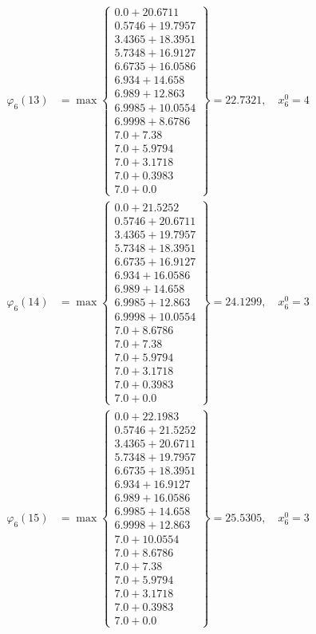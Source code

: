 \documentclass{article}
\begin{document}
\begin{align*}
\varphi_{6}(13) &= \max \left\{ \begin{array}{c}
0.0 + 20.6711 \\
 0.5746 + 19.7957 \\
 3.4365 + 18.3951 \\
 5.7348 + 16.9127 \\
 6.6735 + 16.0586 \\
 6.934 + 14.658 \\
 6.989 + 12.863 \\
 6.9985 + 10.0554 \\
 6.9998 + 8.6786 \\
 7.0 + 7.38 \\
 7.0 + 5.9794 \\
 7.0 + 3.1718 \\
 7.0 + 0.3983 \\
 7.0 + 0.0
\end{array} \right\}=22.7321, \quad x_{6}^0=4\\
  
\varphi_{6}(14) &= \max \left\{ \begin{array}{c}
0.0 + 21.5252 \\
 0.5746 + 20.6711 \\
 3.4365 + 19.7957 \\
 5.7348 + 18.3951 \\
 6.6735 + 16.9127 \\
 6.934 + 16.0586 \\
 6.989 + 14.658 \\
 6.9985 + 12.863 \\
 6.9998 + 10.0554 \\
 7.0 + 8.6786 \\
 7.0 + 7.38 \\
 7.0 + 5.9794 \\
 7.0 + 3.1718 \\
 7.0 + 0.3983 \\
 7.0 + 0.0
\end{array} \right\}=24.1299, \quad x_{6}^0=3\\
  
\varphi_{6}(15) &= \max \left\{ \begin{array}{c}
0.0 + 22.1983 \\
 0.5746 + 21.5252 \\
 3.4365 + 20.6711 \\
 5.7348 + 19.7957 \\
 6.6735 + 18.3951 \\
 6.934 + 16.9127 \\
 6.989 + 16.0586 \\
 6.9985 + 14.658 \\
 6.9998 + 12.863 \\
 7.0 + 10.0554 \\
 7.0 + 8.6786 \\
 7.0 + 7.38 \\
 7.0 + 5.9794 \\
 7.0 + 3.1718 \\
 7.0 + 0.3983 \\
 7.0 + 0.0
\end{array} \right\}=25.5305, \quad x_{6}^0=3\\
  

\end{align*}
\end{document}
